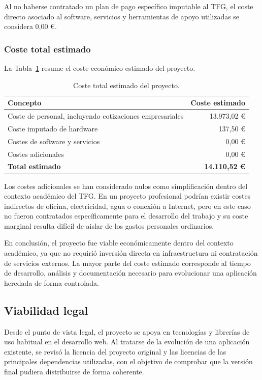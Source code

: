 Al no haberse contratado un plan de pago específico imputable al TFG, el coste directo asociado al software, servicios y herramientas de apoyo utilizadas se considera 0,00 €.

\subsubsection{Coste total estimado}

La Tabla~\ref{tab:coste_total_proyecto} resume el coste económico estimado del proyecto.

\begin{table}[H]
\centering
\small
\renewcommand{\arraystretch}{1.2}
\begin{tabular}{p{} r}
\toprule
\textbf{Concepto} & \textbf{Coste estimado} \tabularnewline
\midrule
Coste de personal, incluyendo cotizaciones empresariales & 13.973,02 € \tabularnewline
Coste imputado de hardware & 137,50 € \tabularnewline
Costes de software y servicios & 0,00 € \tabularnewline
Costes adicionales & 0,00 € \tabularnewline
\midrule
\textbf{Total estimado} & \textbf{14.110,52 €} \tabularnewline
\bottomrule
\end{tabular}
\caption{Coste total estimado del proyecto.}
\label{tab:coste_total_proyecto}
\end{table}

Los costes adicionales se han considerado nulos como simplificación dentro del contexto académico del TFG. En un proyecto profesional podrían existir costes indirectos de oficina, electricidad, agua o conexión a Internet, pero en este caso no fueron contratados específicamente para el desarrollo del trabajo y su coste marginal resulta difícil de aislar de los gastos personales ordinarios.

En conclusión, el proyecto fue viable económicamente dentro del contexto académico, ya que no requirió inversión directa en infraestructura ni contratación de servicios externos. La mayor parte del coste estimado corresponde al tiempo de desarrollo, análisis y documentación necesario para evolucionar una aplicación heredada de forma controlada.

\subsection{Viabilidad legal}

Desde el punto de vista legal, el proyecto se apoya en tecnologías y librerías de uso habitual en el desarrollo web. Al tratarse de la evolución de una aplicación existente, se revisó la licencia del proyecto original y las licencias de las principales dependencias utilizadas, con el objetivo de comprobar que la versión final pudiera distribuirse de forma coherente.

